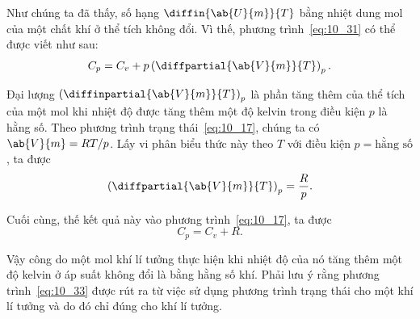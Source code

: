 \noindent

Như chúng ta đã thấy, số hạng $\diffin{\ab{U}{m}}{T}$ bằng nhiệt dung mol của một chất khí ở thể tích không đổi. Vì thế, phương trình~\eqref{eq:10_31} có thể được viết như sau: 
\begin{equation}\label{eq:10_32}
	C_p = C_v + p\left(\diffpartial{\ab{V}{m}}{T}\right)_p.
\end{equation}


Đại lượng $\left(\diffinpartial{\ab{V}{m}}{T}\right)_p$ là phần tăng thêm của thể tích của một mol khi nhiệt độ được tăng thêm một độ kelvin trong điều kiện $p$ là hằng số. Theo phương trình trạng thái~\eqref{eq:10_17}, chúng ta có $\ab{V}{m}=RT/p$. Lấy vi phân biểu thức này theo $T$ với điều kiện $p=\text{hằng số}$, ta được
\begin{equation*}
	\left(\diffpartial{\ab{V}{m}}{T}\right)_p = \frac{R}{p}.
\end{equation*}

\noindent

Cuối cùng, thế kết quả này vào phương trình~\eqref{eq:10_17}, ta được
\begin{equation}\label{eq:10_33}
	C_p = C_v + R.
\end{equation}


Vậy công do một mol khí lí tưởng thực hiện khi nhiệt độ của nó tăng thêm một độ kelvin ở áp suất không đổi là bằng hằng số khí. Phải lưu ý rằng phương trình~\eqref{eq:10_33} được rút ra từ việc sử dụng phương trình trạng thái cho một khí lí tưởng và do đó chỉ đúng cho khí lí tưởng.


